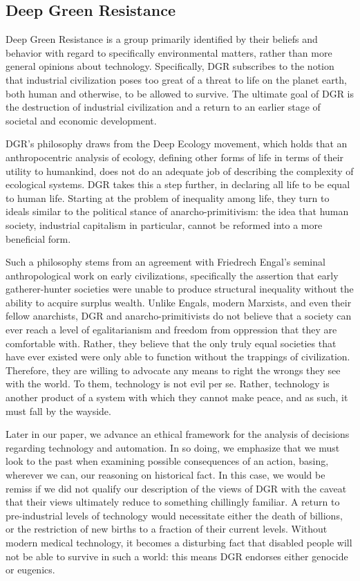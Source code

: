 \subsection{Deep Green Resistance}
\label{sec:-dgr}
Deep Green Resistance is a group primarily identified by their beliefs 
and behavior with regard to specifically environmental matters, rather 
than more general opinions about technology.  Specifically, DGR subscribes 
to the notion that industrial civilization poses too great of a threat 
to life on the planet earth, both human and otherwise, to be allowed to 
survive.  The ultimate goal of DGR is the destruction of industrial 
civilization and a return to an earlier stage of societal and economic 
development.  

DGR's philosophy draws from the Deep Ecology movement, 
which holds that an anthropocentric analysis of ecology, defining other 
forms of life in terms of their utility to humankind, does not do an 
adequate job of describing the complexity of ecological systems.  DGR 
takes this a step further, in declaring all life to be equal to human 
life.  Starting at the problem of inequality among life, they turn to 
ideals similar to the political stance of anarcho-primitivism: the idea 
that human society, industrial capitalism in particular, cannot be 
reformed into a more beneficial form.  

Such a philosophy stems from 
an agreement with Friedrech Engal's seminal anthropological work on 
early civilizations\cite{engels2010origin}, specifically the assertion that 
early gatherer-hunter societies were unable to produce structural 
inequality without the ability to acquire surplus wealth.  Unlike Engals, 
modern Marxists, and even their fellow anarchists, DGR and 
anarcho-primitivists do not believe that a society can ever reach a level 
of egalitarianism and freedom from oppression that they are comfortable 
with.  Rather, they believe that the only truly equal societies that have 
ever existed were only able to function without the trappings of 
civilization.  Therefore, they are willing to advocate any means to right 
the wrongs they see with the world.  To them, technology is not evil 
per se.  Rather, technology is another product of a system with which 
they cannot make peace, and as such, it must fall by the wayside.

Later in our paper, we advance an ethical framework for the analysis of 
decisions regarding technology and automation.  In so doing, we 
emphasize that we must look to the past when examining possible 
consequences of an action, basing, wherever we can, our reasoning on 
historical fact.  In this case, we would be remiss if we did not qualify 
our description of the views of DGR with the caveat that their views 
ultimately reduce to something chillingly familiar.  A return to 
pre-industrial levels of technology would necessitate either the death 
of billions, or the restriction of new births to a fraction of their 
current levels.  Without modern medical technology, it becomes a 
disturbing fact that disabled people will not be able to survive in 
such a world: this means DGR endorses either genocide or eugenics.

